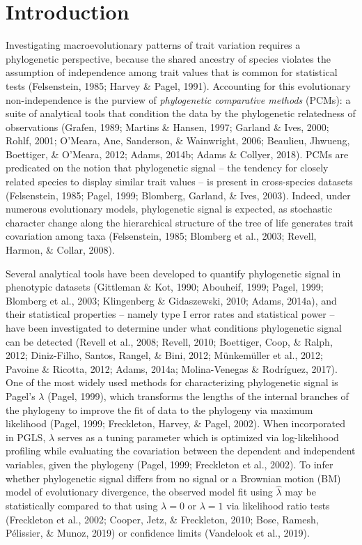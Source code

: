 \documentclass[
]{article}
\begin{document}
\newpage

\hypertarget{introduction}{%
\section{Introduction}\label{introduction}}

Investigating macroevolutionary patterns of trait variation requires a
phylogenetic perspective, because the shared ancestry of species
violates the assumption of independence among trait values that is
common for statistical tests (Felsenstein, 1985; Harvey \& Pagel, 1991).
Accounting for this evolutionary non-independence is the purview of
\emph{phylogenetic comparative methods} (PCMs): a suite of analytical
tools that condition the data by the phylogenetic relatedness of
observations (Grafen, 1989; Martins \& Hansen, 1997; Garland \& Ives,
2000; Rohlf, 2001; O'Meara, Ane, Sanderson, \& Wainwright, 2006;
Beaulieu, Jhwueng, Boettiger, \& O'Meara, 2012; Adams, 2014b; Adams \&
Collyer, 2018). PCMs are predicated on the notion that phylogenetic
signal -- the tendency for closely related species to display similar
trait values -- is present in cross-species datasets (Felsenstein, 1985;
Pagel, 1999; Blomberg, Garland, \& Ives, 2003). Indeed, under numerous
evolutionary models, phylogenetic signal is expected, as stochastic
character change along the hierarchical structure of the tree of life
generates trait covariation among taxa (Felsenstein, 1985; Blomberg et
al., 2003; Revell, Harmon, \& Collar, 2008). \hfill\break

Several analytical tools have been developed to quantify phylogenetic
signal in phenotypic datasets (Gittleman \& Kot, 1990; Abouheif, 1999;
Pagel, 1999; Blomberg et al., 2003; Klingenberg \& Gidaszewski, 2010;
Adams, 2014a), and their statistical properties -- namely type I error
rates and statistical power -- have been investigated to determine under
what conditions phylogenetic signal can be detected (Revell et al.,
2008; Revell, 2010; Boettiger, Coop, \& Ralph, 2012; Diniz-Filho,
Santos, Rangel, \& Bini, 2012; Münkemüller et al., 2012; Pavoine \&
Ricotta, 2012; Adams, 2014a; Molina-Venegas \& Rodríguez, 2017). One of
the most widely used methods for characterizing phylogenetic signal is
Pagel's \(\lambda\) (Pagel, 1999), which transforms the lengths of the
internal branches of the phylogeny to improve the fit of data to the
phylogeny via maximum likelihood (Pagel, 1999; Freckleton, Harvey, \&
Pagel, 2002). When incorporated in PGLS, \(\lambda\) serves as a tuning
parameter which is optimized via log-likelihood profiling while
evaluating the covariation between the dependent and independent
variables, given the phylogeny (Pagel, 1999; Freckleton et al., 2002).
To infer whether phylogenetic signal differs from no signal or a
Brownian motion (BM) model of evolutionary divergence, the observed
model fit using \(\hat\lambda\) may be statistically compared to that
using \(\lambda=0\) or \(\lambda=1\) via likelihood ratio tests
(Freckleton et al., 2002; Cooper, Jetz, \& Freckleton, 2010; Bose,
Ramesh, Pélissier, \& Munoz, 2019) or confidence limits (Vandelook et
al., 2019). \hfill\break
\end{document}
